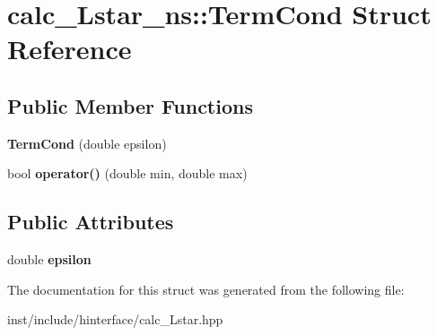 \hypertarget{structcalc___lstar__ns_1_1_term_cond}{}\section{calc\+\_\+\+Lstar\+\_\+ns\+:\+:Term\+Cond Struct Reference}
\label{structcalc___lstar__ns_1_1_term_cond}
\subsection*{Public Member Functions}
\begin{DoxyCompactItemize}
\item 
{\bfseries Term\+Cond} (double epsilon)\hypertarget{structcalc___lstar__ns_1_1_term_cond_a328b2d1240449d580edbb6798cdcba4d}{}\label{structcalc___lstar__ns_1_1_term_cond_a328b2d1240449d580edbb6798cdcba4d}

\item 
bool {\bfseries operator()} (double min, double max)\hypertarget{structcalc___lstar__ns_1_1_term_cond_a72382886584df664c04b61780caaac21}{}\label{structcalc___lstar__ns_1_1_term_cond_a72382886584df664c04b61780caaac21}

\end{DoxyCompactItemize}
\subsection*{Public Attributes}
\begin{DoxyCompactItemize}
\item 
double {\bfseries epsilon}\hypertarget{structcalc___lstar__ns_1_1_term_cond_a8d0cf4a226fb0c8c93c691249f6a6216}{}\label{structcalc___lstar__ns_1_1_term_cond_a8d0cf4a226fb0c8c93c691249f6a6216}

\end{DoxyCompactItemize}


The documentation for this struct was generated from the following file\+:\begin{DoxyCompactItemize}
\item 
inst/include/hinterface/calc\+\_\+\+Lstar.\+hpp\end{DoxyCompactItemize}
